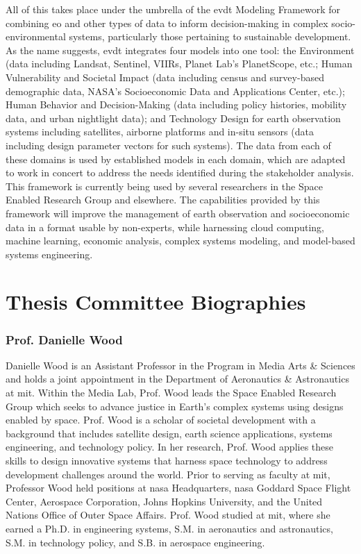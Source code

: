 \documentclass[notitlepage]{report}
\begin{document}
All of this takes place under the umbrella of the \ac{evdt} Modeling Framework for combining \ac{eo} and other types of data to inform decision-making in complex socio-environmental systems, particularly those pertaining to sustainable development. As the name suggests, \ac{evdt} integrates four models into one tool: the Environment (data including Landsat, Sentinel, VIIRs, Planet Lab’s PlanetScope, etc.; Human Vulnerability and Societal Impact (data including census and survey-based demographic data, NASA’s Socioeconomic Data and Applications Center, etc.); Human Behavior and Decision-Making (data including policy histories, mobility data, and urban nightlight data); and Technology Design for earth observation systems including satellites, airborne platforms and in-situ sensors (data including design parameter vectors for such systems). The data from each of these domains is used by established models in each domain, which are adapted to work in concert to address the needs identified during the stakeholder analysis. This framework is currently being used by several researchers in the Space Enabled Research Group and elsewhere. The capabilities provided by this framework will improve the management of earth observation and socioeconomic data in a format usable by non-experts, while harnessing cloud computing, machine learning, economic analysis, complex systems modeling, and model-based systems engineering.




\chapter*{\vspace{-2.0cm}Thesis Committee Biographies}

\subsection*{Prof. Danielle Wood}

Danielle Wood is an Assistant Professor in the Program in Media Arts \& Sciences and holds a joint appointment in the Department of Aeronautics \& Astronautics at \ac{mit}. Within the Media Lab, Prof. Wood leads the Space Enabled Research Group which seeks to advance justice in Earth's complex systems using designs enabled by space. Prof. Wood is a scholar of societal development with a background that includes satellite design, earth science applications, systems engineering, and technology policy. In her research, Prof. Wood applies these skills to design innovative systems that harness space technology to address development challenges around the world. Prior to serving as faculty at \ac{mit}, Professor Wood held positions at \ac{nasa} Headquarters, \ac{nasa} Goddard Space Flight Center, Aerospace Corporation, Johns Hopkins University, and the United Nations Office of Outer Space Affairs. Prof. Wood studied at \ac{mit}, where she earned a Ph.D. in engineering systems, S.M. in aeronautics and astronautics, S.M. in technology policy, and S.B. in aerospace engineering.
\end{document}
